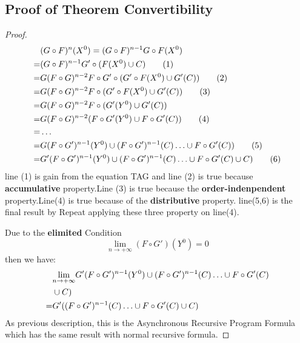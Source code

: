 \documentclass{vldb}
\begin{document}
\begin{appendix}
 \subsection{Proof of Theorem Convertibility}
 \begin{proof}
 \begin{align}
&(G \circ F)^n(X^0)=(G \circ F)^{n-1}G \circ F(X^{0})\notag\\
=&(G \circ F)^{n-1}G'\circ (F(X^{0}) \cup C)\tag{1}\\
=&G(F \circ G)^{n-2}F \circ G'\circ (G'\circ F(X^{0}) \cup G'(C))\tag{2}\\
=&G(F \circ G)^{n-2}F \circ (G'\circ F(X^{0}) \cup G'(C))\tag{3}\\
=&G(F \circ G)^{n-2}F \circ (G'(Y^{0}) \cup G'(C))\notag\\
=&G(F \circ G)^{n-2}(F \circ G'(Y^{0}) \cup F\circ G'(C))\tag{4}\\
=&\ldots \notag\\
=&G(F \circ G')^{n-1}(Y^0)\cup(F \circ G')^{n-1}(C)\ldots \cup F\circ G'(C))\tag{5} \\
=&G'(F \circ G')^{n-1}(Y^0)\cup(F \circ G')^{n-1}(C)\ldots \cup F\circ G'(C) \cup  C)\tag{6}
 \end{align}
line (1) is gain from the equation TAG and  line (2) is true because \textbf{accumulative} property.Line (3) is true because the \textbf{order-indenpendent} property.Line(4) is true because of the \textbf{distributive} property.
line(5,6) is the final result by Repeat applying these three property on line(4).

Due to the \textbf{elimited} Condition $${\lim_{n \to +\infty}(F \circ G')(Y^0)=0}$$
then we have:
\begin{align}
&{\lim_{n\to +\infty}}G'(F \circ G')^{n-1}(Y^0)\cup(F \circ G')^{n-1}(C)\ldots \cup F\circ G'(C) \notag\\
&\cup C)\notag\\
=&G'((F \circ G')^{n-1}(C)\ldots \cup F\circ G'(C)\cup C)\notag
\end{align}
As previous description, this is the Asynchronous Recursive Program Formula which has the same result with normal recursive formula.

 \end{proof}


\end{appendix}
\end{document}
